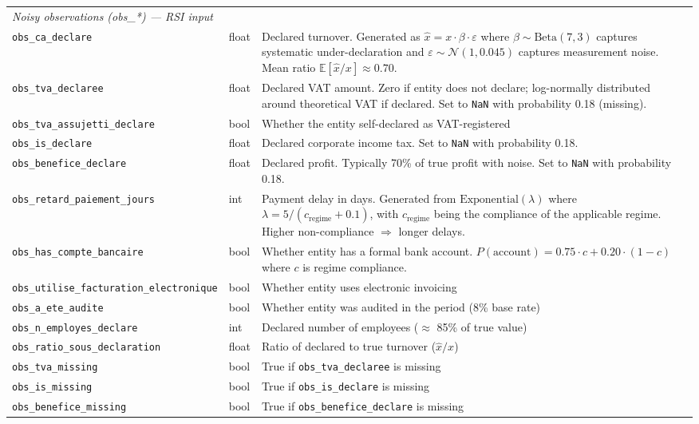 \begin{longtable}{lp{2.2cm}p{6cm}}
\multicolumn{3}{l}{\textit{Noisy observations (obs\_*) --- RSI input}} \\[2pt]
\texttt{obs\_ca\_declare} & float & Declared turnover. Generated as $\hat{x} = x \cdot \beta \cdot \varepsilon$ where $\beta \sim \text{Beta}(7,3)$ captures systematic under-declaration and $\varepsilon \sim \mathcal{N}(1, 0.045)$ captures measurement noise. Mean ratio $\mathbb{E}[\hat{x}/x] \approx 0.70$. \\
\texttt{obs\_tva\_declaree} & float & Declared VAT amount. Zero if entity does not declare; log-normally distributed around theoretical VAT if declared. Set to \texttt{NaN} with probability 0.18 (missing). \\
\texttt{obs\_tva\_assujetti\_declare} & bool & Whether the entity self-declared as VAT-registered \\
\texttt{obs\_is\_declare} & float & Declared corporate income tax. Set to \texttt{NaN} with probability 0.18. \\
\texttt{obs\_benefice\_declare} & float & Declared profit. Typically 70\% of true profit with noise. Set to \texttt{NaN} with probability 0.18. \\
\texttt{obs\_retard\_paiement\_jours} & int & Payment delay in days. Generated from $\text{Exponential}(\lambda)$ where $\lambda = 5 / (c_{\text{regime}} + 0.1)$, with $c_{\text{regime}}$ being the compliance of the applicable regime. Higher non-compliance $\Rightarrow$ longer delays. \\
\texttt{obs\_has\_compte\_bancaire} & bool & Whether entity has a formal bank account. $P(\text{account}) = 0.75 \cdot c + 0.20 \cdot (1-c)$ where $c$ is regime compliance. \\
\texttt{obs\_utilise\_facturation\_electronique} & bool & Whether entity uses electronic invoicing \\
\texttt{obs\_a\_ete\_audite} & bool & Whether entity was audited in the period (8\% base rate) \\
\texttt{obs\_n\_employes\_declare} & int & Declared number of employees ($\approx$ 85\% of true value) \\
\texttt{obs\_ratio\_sous\_declaration} & float & Ratio of declared to true turnover ($\hat{x}/x$) \\
\texttt{obs\_tva\_missing} & bool & True if \texttt{obs\_tva\_declaree} is missing \\
\texttt{obs\_is\_missing} & bool & True if \texttt{obs\_is\_declare} is missing \\
\texttt{obs\_benefice\_missing} & bool & True if \texttt{obs\_benefice\_declare} is missing \\[6pt]


\end{longtable}
